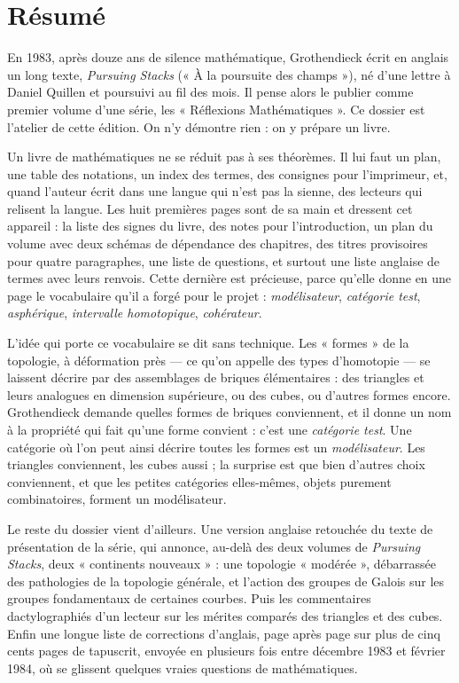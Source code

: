 \documentclass[11pt,a4paper]{article}
\begin{document}
\section*{Résumé}

\begin{resume}
En 1983, après douze ans de silence mathématique, Grothendieck écrit en
anglais un long texte, \emph{Pursuing Stacks} (« À la poursuite des champs »),
né d'une lettre à Daniel Quillen et poursuivi au fil des mois. Il pense alors
le publier comme premier volume d'une série, les « Réflexions
Mathématiques ». Ce dossier est l'atelier de cette édition. On n'y démontre
rien : on y prépare un livre.

Un livre de mathématiques ne se réduit pas à ses théorèmes. Il lui faut un
plan, une table des notations, un index des termes, des consignes pour
l'imprimeur, et, quand l'auteur écrit dans une langue qui n'est pas la sienne,
des lecteurs qui relisent la langue. Les huit premières pages sont de sa main
et dressent cet appareil : la liste des signes du livre, des notes pour
l'introduction, un plan du volume avec deux schémas de dépendance des chapitres,
des titres provisoires pour quatre paragraphes, une liste de questions, et
surtout une liste anglaise de termes avec leurs renvois. Cette dernière est
précieuse, parce qu'elle donne en une page le vocabulaire qu'il a forgé pour
le projet : \emph{modélisateur}, \emph{catégorie test}, \emph{asphérique},
\emph{intervalle homotopique}, \emph{cohérateur}.

L'idée qui porte ce vocabulaire se dit sans technique. Les « formes » de la
topologie, à déformation près --- ce qu'on appelle des types d'homotopie ---
se laissent décrire par des assemblages de briques élémentaires : des
triangles et leurs analogues en dimension supérieure, ou des cubes, ou
d'autres formes encore. Grothendieck demande quelles formes de briques
conviennent, et il donne un nom à la propriété qui fait qu'une forme convient
: c'est une \emph{catégorie test}. Une catégorie où l'on peut ainsi décrire
toutes les formes est un \emph{modélisateur}. Les triangles conviennent, les
cubes aussi ; la surprise est que bien d'autres choix conviennent, et que les
petites catégories elles-mêmes, objets purement combinatoires, forment un
modélisateur.

Le reste du dossier vient d'ailleurs. Une version anglaise retouchée du texte
de présentation de la série, qui annonce, au-delà des deux volumes de
\emph{Pursuing Stacks}, deux « continents nouveaux » : une topologie
« modérée », débarrassée des pathologies de la topologie générale, et l'action
des groupes de Galois sur les groupes fondamentaux de certaines courbes. Puis
les commentaires dactylographiés d'un lecteur sur les mérites comparés des
triangles et des cubes. Enfin une longue liste de corrections d'anglais, page
après page sur plus de cinq cents pages de tapuscrit, envoyée en plusieurs fois
entre décembre 1983 et février 1984, où se glissent quelques vraies questions
de mathématiques.


\end{resume}
\end{document}
